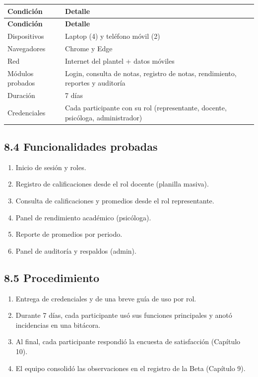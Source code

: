 \documentclass[11pt,a4paper]{article}
\begin{document}
{\small
\begin{longtable}{|p{}|p{}|}
\rowcolor{UTECblue}\color{white}\bfseries Condición & \color{white}\bfseries Detalle \\ \hline
\endfirsthead
\rowcolor{UTECblue}\color{white}\bfseries Condición & \color{white}\bfseries Detalle \\ \hline
\endhead
Dispositivos & Laptop (4) y teléfono móvil (2) \\ \hline
Navegadores & Chrome y Edge \\ \hline
Red & Internet del plantel + datos móviles \\ \hline
Módulos probados & Login, consulta de notas, registro de notas, rendimiento, reportes y auditoría \\ \hline
Duración & 7 días \\ \hline
Credenciales & Cada participante con su rol (representante, docente, psicóloga, administrador) \\ \hline
\end{longtable}}


\subsection*{8.4 Funcionalidades probadas}


\begin{enumerate}[leftmargin=*]
\item Inicio de sesión y roles.
\item Registro de calificaciones desde el rol docente (planilla masiva).
\item Consulta de calificaciones y promedios desde el rol representante.
\item Panel de rendimiento académico (psicóloga).
\item Reporte de promedios por periodo.
\item Panel de auditoría y respaldos (admin).
\end{enumerate}


\subsection*{8.5 Procedimiento}


\begin{enumerate}[leftmargin=*]
\item Entrega de credenciales y de una breve guía de uso por rol.
\item Durante 7 días, cada participante usó sus funciones principales y anotó incidencias en una bitácora.
\item Al final, cada participante respondió la encuesta de satisfacción (Capítulo 10).
\item El equipo consolidó las observaciones en el registro de la Beta (Capítulo 9).
\end{enumerate}
\end{document}
